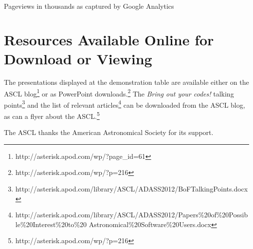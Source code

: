 {Pageviews in thousands as captured by Google Analytics}


\section{Resources Available Online for Download or Viewing}
The presentations displayed at the demonstration table are available either on the ASCL blog\footnote{http://asterisk.apod.com/wp/?page\_id=61} or as PowerPoint downloads.\footnote{http://asterisk.apod.com/wp/?p=216} The {\em Bring out your codes!} talking points\footnote{http://asterisk.apod.com/library/ASCL/ADASS2012/BoFTalkingPoints.docx} and the list of relevant articles\footnote{http://asterisk.apod.com/library/ASCL/ADASS2012/Papers\%20of\%20Possible\%20Interest\%20to\%20 Astronomical\%20Software\%20Users.docx} can be downloaded from the ASCL blog, as can a flyer about the ASCL.\footnote{http://asterisk.apod.com/wp/?p=216}


\acknowledgements The ASCL thanks the American Astronomical Society for its support.




